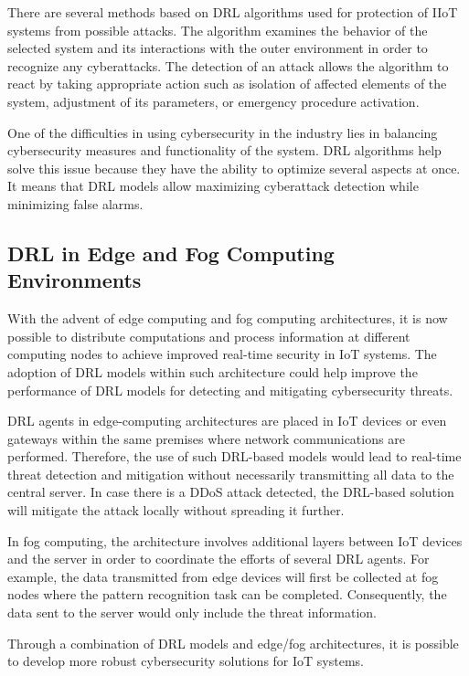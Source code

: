 \documentclass[12pt]{article}
\begin{document}
There are several methods based on DRL algorithms used for protection of IIoT systems from possible attacks. The algorithm examines the behavior of the selected system and its interactions with the outer environment in order to recognize any cyberattacks. The detection of an attack allows the algorithm to react by taking appropriate action such as isolation of affected elements of the system, adjustment of its parameters, or emergency procedure activation.

One of the difficulties in using cybersecurity in the industry lies in balancing cybersecurity measures and functionality of the system. DRL algorithms help solve this issue because they have the ability to optimize several aspects at once. It means that DRL models allow maximizing cyberattack detection while minimizing false alarms.
\subsection{DRL in Edge and Fog Computing Environments}\cite{far2025artificialintelligencesecuredinformation}
With the advent of edge computing and fog computing architectures, it is now possible to distribute computations and process information at different computing nodes to achieve improved real-time security in IoT systems. The adoption of DRL models within such architecture could help improve the performance of DRL models for detecting and mitigating cybersecurity threats.

DRL agents in edge-computing architectures are placed in IoT devices or even gateways within the same premises where network communications are performed. Therefore, the use of such DRL-based models would lead to real-time threat detection and mitigation without necessarily transmitting all data to the central server. In case there is a DDoS attack detected, the DRL-based solution will mitigate the attack locally without spreading it further.

In fog computing, the architecture involves additional layers between IoT devices and the server in order to coordinate the efforts of several DRL agents. For example, the data transmitted from edge devices will first be collected at fog nodes where the pattern recognition task can be completed. Consequently, the data sent to the server would only include the threat information.

Through a combination of DRL models and edge/fog architectures, it is possible to develop more robust cybersecurity solutions for IoT systems.
\end{document}
